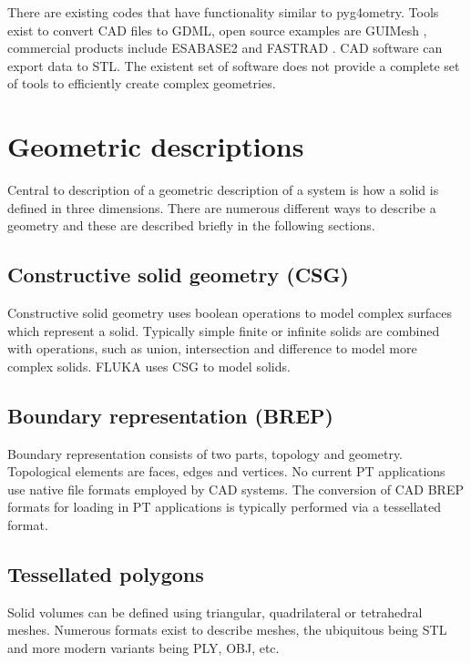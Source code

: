 \documentclass[final,5p,times,twocolumn]{elsarticle}
\begin{document}
There are existing codes that have functionality similar to pyg4ometry. Tools exist to convert CAD files to GDML, open source examples are GUIMesh \cite{GUIMesh_Pinto}, 
commercial products include ESABASE2 \cite{ESABASE2} and FASTRAD \cite{FASTRAD}. 
CAD software can export data to STL. The existent set of software does not provide a complete set of tools to efficiently create complex geometries.   

\section{Geometric descriptions} \label{sec:geometric}
Central to description of a geometric description of a system is how a solid is defined in three dimensions. There are numerous different ways to describe a
geometry and these are described briefly in the following sections.  

\subsection{Constructive solid geometry (CSG)}
Constructive solid geometry uses boolean operations to model complex surfaces which represent a solid. Typically simple finite or infinite solids are combined 
with operations, such as union, intersection and difference to model more complex solids. FLUKA uses CSG to model solids.

\subsection{Boundary representation (BREP)}
Boundary representation consists of two parts, topology and geometry. Topological elements are faces, edges and vertices. No current PT applications use native 
file formats employed by CAD systems. The conversion of CAD BREP formats for loading in PT applications is typically performed via a tessellated format. 

\subsection{Tessellated polygons}
Solid volumes can be defined using triangular, quadrilateral or tetrahedral meshes. Numerous formats exist to describe meshes, the ubiquitous being STL and more 
modern variants being PLY, OBJ, etc.  
\end{document}

